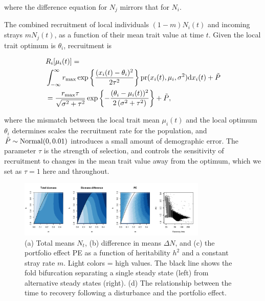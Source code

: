 \documentclass[twocolumn,preprintnumbers,amsmath,amssymb,superscriptaddress]{revtex4}
\begin{document}
\noindent where the difference equation for $N_j$ mirrors that for $N_i$.

The combined recruitment of local individuals $(1-m)N_i(t)$ and incoming strays $mN_j(t)$, as a function of their mean trait value at time $t$.
Given the local trait optimum is $\theta_i$, recruitment is

\begin{align}
  &R_i[\mu_i(t)] = \\ \nonumber
  &\int_{-\infty}^\infty r_{\rm max}\exp\left\{\frac{(x_i(t)-\theta_i)^2}{2\tau^2}\right\} {\rm pr}(x_i(t),\mu_i,\sigma^2) {\rm d}x_i(t) +\tilde{P}\\ \nonumber
  &= \frac{r_{\rm max} \tau  }{\sqrt{\sigma ^2+\tau ^2}}\exp\left\{-\frac{(\theta_i-\mu_i(t))^2}{2 \left(\sigma ^2+\tau ^2\right)}\right\} +\tilde{P},
  \label{eq:R}
\end{align}

\noindent where the mismatch between the local trait mean $\mu_i(t)$ and the local optimum $\theta_i$ determines scales the recruitment rate for the population, and $\tilde{P}\sim {\rm Normal}(0,0.01)$ introduces a small amount of demographic error.
The parameter $\tau$ is the strength of selection, and controls the sensitivity of recruitment to changes in the mean trait value away from the optimum, which we set as $\tau=1$ here and throughout.
\\

\begin{figure}
  \captionsetup{justification=raggedright,
singlelinecheck=false
}
\centering
\includegraphics[width=0.8\textwidth]{figs2/fig_MDPE_hm.pdf}
\caption{
(a) Total means $N_t$, (b) difference in means $\Delta N$, and (c) the portfolio effect PE as a function of heritability $h^2$ and a constant stray rate $m$. Light colors = high values.
The black line shows the fold bifurcation separating a single steady state (left) from alternative steady states (right).
(d) The relationship between the time to recovery following a disturbance and the portfolio effect.
} \label{fig:PE}
\end{figure}
\end{document}
